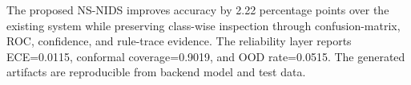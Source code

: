 The proposed NS-NIDS improves accuracy by 2.22 percentage points over the existing system while preserving class-wise inspection through confusion-matrix, ROC, confidence, and rule-trace evidence. The reliability layer reports ECE=0.0115, conformal coverage=0.9019, and OOD rate=0.0515. The generated artifacts are reproducible from backend model and test data.